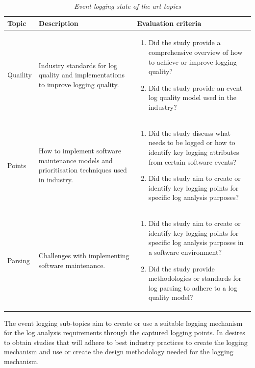\begin{table}[!htb]
	\centering
	\caption[Event logging state of the art topics]
	{\textit{Event logging state of the art topics}}
	\label{tbl:ch1_soaEventLogging}
	\begin{tabularx}{\linewidth}{|l|X|X|}
		\hline \textbf{Topic}  & \textbf{Description} & \textbf{Evaluation criteria}\\
		\hline Quaility & \RaggedRight Industry standards for log quality and implementations to improve logging quality.& \RaggedRight \begin{enumerate}
			\item Did the study provide a comprehensive overview of how to achieve or improve logging quality?
			\item Did the study provide an event log quality model used in the industry?
		\end{enumerate} \\
		\hline Points & \RaggedRight How to implement software maintenance models and prioritisation techniques used in industry. & \RaggedRight \begin{enumerate}
			\item Did the study discuss what needs to be logged or how to identify key logging attributes from certain software events?
			\item Did the study aim to create or identify key logging points for specific log analysis purposes?
		\end{enumerate} \\
		\hline Parsing & \RaggedRight Challenges with implementing software maintenance. & \RaggedRight \begin{enumerate}
			\item Did the study aim to create or identify key logging points for specific log analysis purposes in a software environment?
			\item Did the study provide methodologies or standards for log parsing to adhere to a log quality model?
		\end{enumerate}\\	
		\hline
	\end{tabularx}
\end{table}

The event logging sub-topics aim to create or use a suitable logging mechanism for the log analysis requirements through the captured logging points. In  desires to obtain studies that will adhere to best industry practices to create the logging mechanism and use or create the design methodology needed for the logging mechanism.

